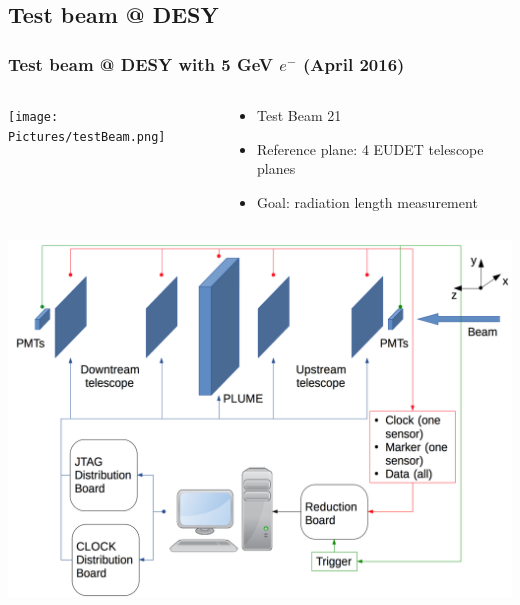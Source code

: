 \documentclass{beamer}
\begin{document}
    \subsection{Test beam @ DESY}

    \begin{frame}
      \frametitle{Test beam @ DESY with 5 GeV $e^-$ (April 2016)}
      
      \begin{columns}[c]
        \begin{column}{5cm}
          \begin{center}
            \texttt{[image: Pictures/testBeam.png]}
          \end{center}
        \end{column}
        \begin{column}{5cm}
          \begin{itemize}
            \item Test Beam 21
            \item Reference plane: 4 EUDET telescope planes
            \item Goal: radiation length measurement
          \end{itemize}
        \end{column}
      \end{columns}
    \end{frame}

    \begin{frame}

      \begin{center}
        \includegraphics[width = \textwidth]{Pictures/testBeamAcquisition.png}
      \end{center}
    \end{frame}
\end{document}
